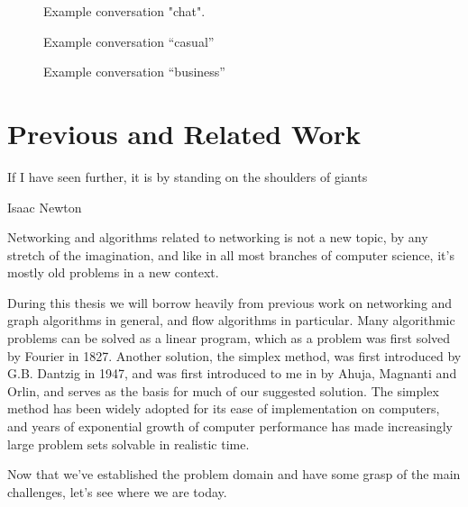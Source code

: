 \begin{figure}[ht!]
\centering
    \caption{Example conversation "chat".}\label{fig:example-conv-chat}
\end{figure}

\begin{figure}[ht!]
\centering
    \caption{Example conversation ``casual''}\label{fig:example-conv-casual}
\end{figure}

\begin{figure}[ht!]
\centering
    \caption{Example conversation ``business''}\label{fig:example-conv-business}
\end{figure}


\section{Previous and Related Work}

\epigraph{If I have seen further, it is by standing on the shoulders of giants}{Isaac Newton}

Networking and algorithms related to networking is not a new topic, by any stretch of the imagination, and like in all most branches of computer science, it's mostly old problems in a new context.

During this thesis we will borrow heavily from previous work on networking and graph algorithms in general, and flow algorithms in particular. Many algorithmic problems can be solved as a linear program, which as a problem was first solved by Fourier in 1827\cite{sierksma2001linear}. Another solution, the simplex method, was first introduced by G.B. Dantzig in 1947\cite{sierksma2001linear}, and was first introduced to me in \cite{ahuja1988network} by Ahuja, Magnanti and Orlin, and serves as the basis for much of our suggested solution. The simplex method has been widely adopted for its ease of implementation on computers, and years of exponential growth of computer performance has made increasingly large problem sets solvable in realistic time.

Now that we've established the problem domain and have some grasp of the main challenges, let's see where we are today.
